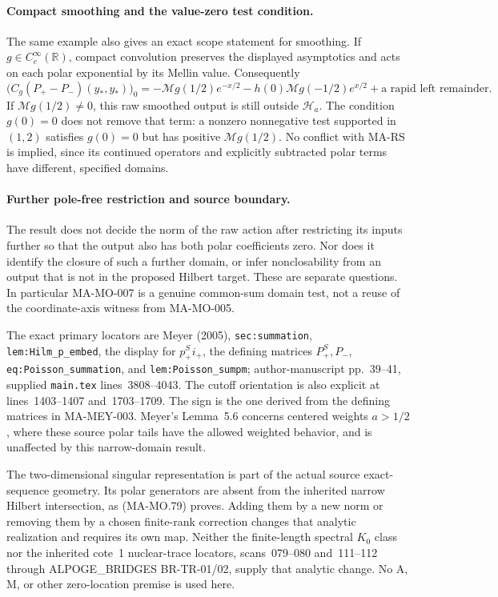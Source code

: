 \paragraph{Compact smoothing and the value-zero test condition.}
The same example also gives an exact scope statement for smoothing.
If \(g\in C_c^\infty(\mathbb R)\), compact convolution preserves
the displayed asymptotics and acts on each polar exponential by
its Mellin value. Consequently
\[
 \bigl(C_g(P_+-P_-)(y_*,y_*)\bigr)_0
   =-\mathcal Mg(1/2)e^{-x/2}
     -h(0)\mathcal Mg(-1/2)e^{x/2}
       +\text{a rapid left remainder}.
 \tag{MA-MO.88}
\]
If \(\mathcal Mg(1/2)\ne0\), this raw smoothed output is
still outside \(\mathcal H_a\). The condition \(g(0)=0\)
does not remove that term: a nonzero nonnegative test supported
in \((1,2)\) satisfies \(g(0)=0\) but has positive
\(\mathcal Mg(1/2)\). No conflict with MA-RS is implied,
since its continued operators and explicitly subtracted polar
terms have different, specified domains.

\paragraph{Further pole-free restriction and source boundary.}
The result does not decide the norm of the raw action after
restricting its inputs further so that the output also has
both polar coefficients zero. Nor does it identify the closure
of such a further domain, or infer nonclosability from an
output that is not in the proposed Hilbert target. These are
separate questions. In particular MA-MO-007 is a genuine
common-sum domain test, not a reuse of the coordinate-axis
witness from MA-MO-005.

The exact primary locators are Meyer (2005),
\texttt{sec:summation}, \texttt{lem:Hilm\_p\_embed}, the
display for \(p_+^S i_+\), the defining matrices \(P_+^S,P_-\),
\texttt{eq:Poisson\_summation}, and \texttt{lem:Poisson\_sumpm};
author-manuscript pp.~39--41, supplied \texttt{main.tex}
lines~3808--4043. The cutoff orientation is also explicit
at lines~1403--1407 and~1703--1709. The sign is the one
derived from the defining matrices in MA-MEY-003.
Meyer's Lemma~5.6 concerns centered weights \(a>1/2\),
where these source polar tails have the allowed weighted
behavior, and is unaffected by this narrow-domain result.

The two-dimensional singular representation is part of the
actual source exact-sequence geometry. Its polar generators
are absent from the inherited narrow Hilbert intersection,
as (MA-MO.79) proves. Adding them by a new norm or removing
them by a chosen finite-rank correction changes that analytic
realization and requires its own map. Neither the finite-length
spectral \(K_0\) class nor the inherited cote~1 nuclear-trace
locators, scans~079--080 and~111--112 through
ALPOGE\_BRIDGES BR-TR-01/02, supply that analytic change.
No A, M, or other zero-location premise is used here.
